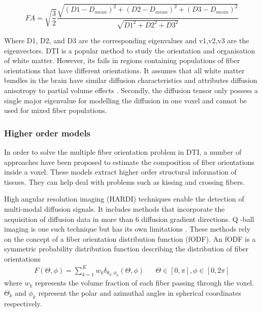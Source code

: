 \documentclass[msthesis.tex]{subfiles}
\begin{document}
\begin{equation}
\label{eq:meanFA}
FA = \sqrt{\frac{3}{2}} \frac{\sqrt{(D1 -D_{mean})^2+(D2 -D_{mean})^2 + (D3 -D_{mean})^2
}}{\sqrt{D1^2 + D2^2 + D3^2}}
\end{equation}

Where D1, D2, and D3 are the corresponding eigenvalues and v1,v2,v3 are the eigenvectors.
DTI is a popular method to study the orientation and organisation of white matter.  However, its fails in regions containing populations of fiber orientations that have different orientations. It assumes that all white matter bundles in the brain have similar diffusion characteristics and attributes diffusion anisotropy to partial volume effects \cite{tournier2004direct}. Secondly, the diffusion tensor only possess a single major eigenvalue for modelling the diffusion in one voxel and cannot be used for mixed fiber populations.
\subsubsection{Higher order models}
\label{sec:highermodels}

In order to solve the multiple fiber orientation problem in DTI, a number of approaches have been proposed to estimate the composition of fiber orientations inside a voxel. These models extract higher order structural information of tissues. They can help deal with problems such as kissing and crossing fibers. 

High angular resolution imaging (HARDI) techniques enable the detection of multi-modal diffusion signals. It includes methods that incorporate the acquisition of diffusion data in more than 6 diffusion gradient directions. Q -ball imaging is one such technique but has its own limitations \cite{TOURNIER20041176}. These methods rely on the concept of a fiber orientation distribution function (fODF). An fODF is a symmetric probability distribution function describing the distribution of fiber orientations
\begin{align}
  F(\Theta, \phi) = \sum_{k=1}^{K} w_k \delta_{\theta_k, \phi_k}(\Theta, \phi) &
 & \Theta \in [0, \pi], \phi \in [0,2\pi]
\end{align}
where $w_k$ represents the volume fraction of each fiber passing through the voxel. $\Theta_k$ and $\phi_k$ represent the polar and azimuthal angles in spherical coordinates respectively.
\end{document}
